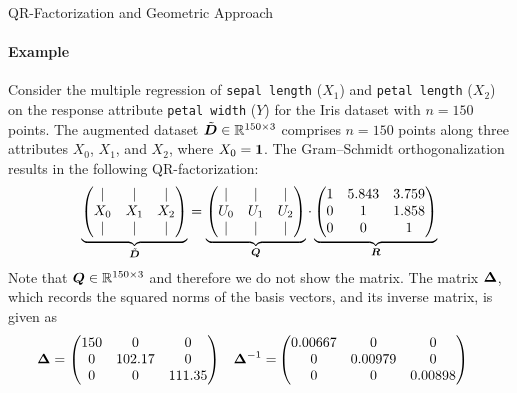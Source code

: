 \begin{frame}{QR-Factorization and Geometric Approach}
\framesubtitle{Example}
Consider the multiple regression of
{\tt sepal length} ($X_1$) and {\tt petal
    length} ($X_2$) on the response attribute {\tt petal width} ($Y$)
for the Iris dataset with $n=150$ points.
The augmented dataset $\tilde{{\boldsymbol D}} \in
{\mathord{\mathbb R}}^{150\times 3}$ comprises $n=150$ points along
three attributes $X_0$, $X_1$, and $X_2$, where $X_0 = \mathbf{1}$.
The Gram--Schmidt orthogonalization results in the following
QR-factorization:
\begin{align*}
    \underbrace{
    \begin{pmatrix} 
      | & |   &  | \\
      X_0 & X_1 & X_2\\
    |   & |   & | \\
     \end{pmatrix}}_{\tilde{{\boldsymbol D}}} 
    = 
    \underbrace{
    \begin{pmatrix} 
      | & |   &  | \\
      U_0 & U_1 & U_2\\
    |   & |   & | \\
     \end{pmatrix}}_{{\boldsymbol Q}} 
    \cdot
    \underbrace{
    \begin{pmatrix} 
        1 & 5.843 & 3.759\\
        0 & 1 & 1.858\\
        0 & 0 & 1
     \end{pmatrix}}_{{\boldsymbol R}} 
\end{align*}
Note that ${\boldsymbol Q} \in {\mathord{\mathbb R}}^{150\times 3}$ and therefore we do not show
the matrix.
The matrix ${\bm \Delta}$, which records the squared norms of the basis vectors, and
its inverse matrix, is given as
\begin{align*}
    {\bm \Delta} & = 
    \begin{pmatrix} 
   150 & 0 & 0\\
   0 & 102.17 & 0\\
   0 & 0 & 111.35  \end{pmatrix} &
   {\bm \Delta}^{-1} = &
    \begin{pmatrix} 
        0.00667 & 0 & 0\\
        0 & 0.00979 & 0\\
    0 & 0 & 0.00898  \end{pmatrix}
\end{align*}
\end{frame}

